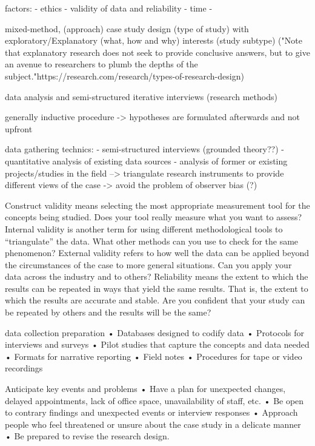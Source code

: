 factors:
- ethics
- validity of data and reliability
- time
- 




mixed-method, (approach)
case study design (type of study) with 
exploratory/Explanatory (what, how and why) interests (study subtype) ("Note that explanatory research does not seek to provide conclusive answers, but to give an avenue to researchers to plumb the depths of the subject."https://research.com/research/types-of-research-design)

data analysis and semi-structured iterative interviews (research methods)


generally inductive procedure -> hypotheses are formulated afterwards and not upfront

data gathering technics:
- semi-structured interviews (grounded theory??)
- quantitative analysis of existing data sources
- analysis of former or existing projects/studies in the field
--> triangulate research instruments to provide different views of the case -> avoid the problem of observer bias (?)

Construct validity means selecting the most appropriate measurement tool for the concepts
being studied. Does your tool really measure what you want to assess?
Internal validity is another term for using different methodological tools to “triangulate” the
data. What other methods can you use to check for the same phenomenon?
External validity refers to how well the data can be applied beyond the circumstances of the
case to more general situations. Can you apply your data across the industry and to others?
Reliability means the extent to which the results can be repeated in ways that yield the same
results. That is, the extent to which the results are accurate and stable. Are you confident that
your study can be repeated by others and the results will be the same?

data collection preparation
•	 Databases designed to codify data
•	 Protocols for interviews and surveys
•	 Pilot studies that capture the concepts and data needed
•	 Formats for narrative reporting
•	 Field notes
•	 Procedures for tape or video recordings

Anticipate key events and problems
•	 Have a plan for unexpected changes, delayed appointments, lack of office space,
unavailability of staff, etc.
•	 Be open to contrary findings and unexpected events or interview responses
•	 Approach people who feel threatened or unsure about the case study in a delicate
manner
•	 Be prepared to revise the research design.

